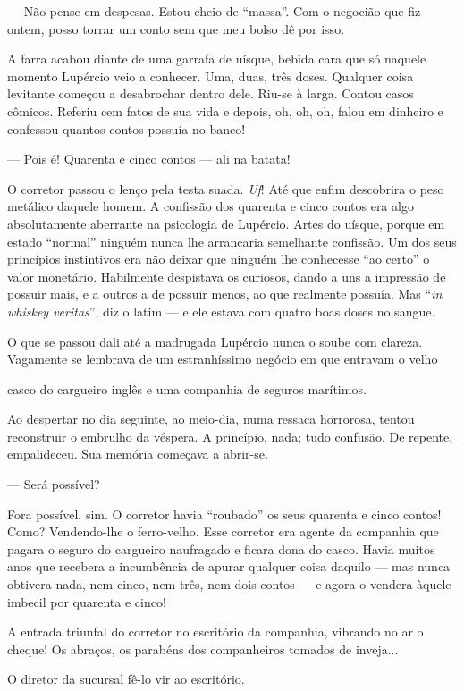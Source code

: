 --- Não pense em despesas. Estou cheio de ``massa''. Com o negocião que
fiz ontem, posso torrar um conto sem que meu bolso dê por isso.

A farra acabou diante de uma garrafa de uísque, bebida cara que só
naquele momento Lupércio veio a conhecer. Uma, duas, três doses.
Qualquer coisa levitante começou a desabrochar dentro dele. Riu-se à
larga. Contou casos cômicos. Referiu cem fatos de sua vida e depois, oh,
oh, oh, falou em dinheiro e confessou quantos contos possuía no banco!

--- Pois é! Quarenta e cinco contos --- ali na batata!

O corretor passou o lenço pela testa suada. \emph{Uf}! Até que enfim
descobrira o peso metálico daquele homem. A confissão dos quarenta e
cinco contos era algo absolutamente aberrante na psicologia de Lupércio.
Artes do uísque, porque em estado ``normal'' ninguém nunca lhe
arrancaria semelhante confissão. Um dos seus princípios instintivos era
não deixar que ninguém lhe conhecesse ``ao certo'' o valor monetário.
Habilmente despistava os curiosos, dando a uns a impressão de possuir
mais, e a outros a de possuir menos, ao que realmente possuía. Mas
``\emph{in whiskey veritas}'', diz o latim --- e ele estava com quatro
boas doses no sangue.

O que se passou dali até a madrugada Lupércio nunca o soube com clareza.
Vagamente se lembrava de um estranhíssimo negócio em que entravam o
velho

casco do cargueiro inglês e uma companhia de seguros marítimos.

Ao despertar no dia seguinte, ao meio-dia, numa ressaca horrorosa,
tentou reconstruir o embrulho da véspera. A princípio, nada; tudo
confusão. De repente, empalideceu. Sua memória começava a abrir-se.

--- Será possível?

Fora possível, sim. O corretor havia ``roubado'' os seus quarenta e
cinco contos! Como? Vendendo-lhe o ferro-velho. Esse corretor era agente
da companhia que pagara o seguro do cargueiro naufragado e ficara dona
do casco. Havia muitos anos que recebera a incumbência de apurar
qualquer coisa daquilo --- mas nunca obtivera nada, nem cinco, nem três,
nem dois contos --- e agora o vendera àquele imbecil por quarenta e
cinco!

A entrada triunfal do corretor no escritório da companhia, vibrando no
ar o cheque! Os abraços, os parabéns dos companheiros tomados de
inveja...

O diretor da sucursal fê-lo vir ao escritório.

